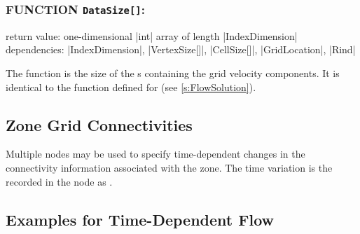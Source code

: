 \subsubsection*{FUNCTION \texttt{DataSize[]}:}

\noindent return value: one-dimensional |int| array of length
          |IndexDimension| \\
\noindent dependencies: |IndexDimension|, |VertexSize[]|, |CellSize[]|,
          |GridLocation|, |Rind|

The function  is the size of the s
containing the grid velocity components.
It is identical to the function  defined for
 (see \autoref{s:FlowSolution}).

\subsection{Zone Grid Connectivities}
\label{s:zonegridconnectivities}

Multiple 
nodes may be used to specify time-dependent changes in the connectivity information
associated with the zone. The time variation is the recorded in the
 node as
.

\subsection{Examples for Time-Dependent Flow}
\label{s:Examplestimedep}

